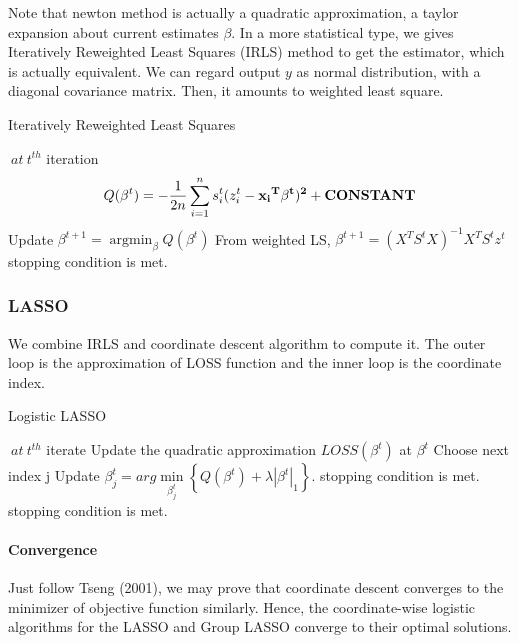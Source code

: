 \documentclass[]{article}
\begin{document}
Note that newton method is actually a quadratic approximation, a taylor expansion about current estimates $\beta$. In a more statistical type, we gives Iteratively Reweighted Least Squares (IRLS)\cite{holland1977robust} method to get the estimator, which is actually equivalent. We can regard output $y$ as normal distribution, with a diagonal covariance matrix. Then, it amounts to weighted least square.
\begin{algorithm}  
	\caption{Iteratively Reweighted Least Squares}  
	\begin{algorithmic}[1] %
		\Repeat $\ at\ t^{th}$ iteration
		\State \begin{equation*}
		Q(\beta^t)=-\frac{1}{2n}\sum_{i=1}^n s_i^t(z_i^t-\bf{x_i}^T\beta^t)^2+CONSTANT
		\end{equation*}
		\State Update $ \beta^{t+1}=\mathop{\arg\min}_{\beta} Q(\beta^t)$
		\State From weighted LS, $\beta^{t+1}=(X^TS^tX)^{-1}X^TS^tz^t$
		\Until stopping condition is met.
	\end{algorithmic}
\end{algorithm} 

\subsubsection{LASSO}
We combine IRLS and coordinate descent algorithm to compute it. The outer loop is the approximation of LOSS function and the inner loop is the coordinate index.
\begin{algorithm}  
	\caption{Logistic LASSO}  
	\begin{algorithmic}[1] %
		\Repeat $\ at\ t^{th}$ iterate
		\State Update the quadratic approximation $ LOSS(\beta^t) $ at $\beta^t$
		\Repeat
		\State Choose next index j
		\State Update $ \beta^t_j =arg\min\limits_{\beta^t_j}\left\{ Q(\beta^t)+\lambda|\beta^t|_1 \right\}$.
		\Until stopping condition is met.
		\Until stopping condition is met.
	\end{algorithmic}
\end{algorithm} 
\paragraph{Convergence}
Just follow Tseng (2001), we may prove that coordinate descent converges to the minimizer of objective function similarly. Hence, the coordinate-wise logistic algorithms for the LASSO and Group LASSO converge to their optimal solutions.
\end{document}

